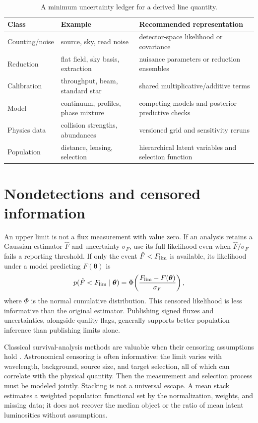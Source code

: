 \begin{table}[htbp]
\centering
\caption{A minimum uncertainty ledger for a derived line quantity.}
\label{tab:uncertainty-ledger}
\begin{tabularx}{\textwidth}{@{}p{}p{}X@{}}
\toprule
Class & Example & Recommended representation \\
\midrule
Counting/noise & source, sky, read noise & detector-space likelihood or covariance \\
Reduction & flat field, sky basis, extraction & nuisance parameters or reduction ensembles \\
Calibration & throughput, beam, standard star & shared multiplicative/additive terms \\
Model & continuum, profiles, phase mixture & competing models and posterior predictive checks \\
Physics data & collision strengths, abundances & versioned grid and sensitivity reruns \\
Population & distance, lensing, selection & hierarchical latent variables and selection function \\
\bottomrule
\end{tabularx}
\end{table}

\section{Nondetections and censored information}

An upper limit is not a flux measurement with value zero.  If an analysis
retains a Gaussian estimator $\hat F$ and uncertainty $\sigma_F$, use its full
likelihood even when $\hat F/\sigma_F$ fails a reporting threshold.  If only the
event $\hat F<F_{\rm lim}$ is available, its likelihood under a model predicting
$F(\boldsymbol{\theta})$ is
\begin{equation}
 p(\hat F<F_{\rm lim}\mid\boldsymbol{\theta})=
 \Phi\!\left(\frac{F_{\rm lim}-F(\boldsymbol{\theta})}{\sigma_F}\right),
 \label{eq:censored-gaussian}
\end{equation}
where $\Phi$ is the normal cumulative distribution.  This censored likelihood
is less informative than the original estimator.  Publishing signed fluxes and
uncertainties, alongside quality flags, generally supports better population
inference than publishing limits alone.

Classical survival-analysis methods are valuable when their censoring assumptions
hold \citep{FeigelsonNelson1985}.  Astronomical censoring is often informative:
the limit varies with wavelength, background, source size, and target selection,
all of which can correlate with the physical quantity.  Then the measurement
and selection process must be modeled jointly.  Stacking is not a universal
escape.  A mean stack estimates a weighted population functional set by the
normalization, weights, and missing data; it does not recover the median object
or the ratio of mean latent luminosities without assumptions.

